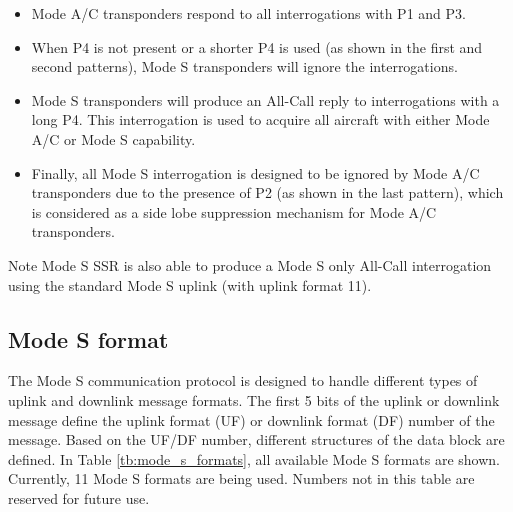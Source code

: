 \begin{itemize}
  \item Mode A/C transponders respond to all interrogations with P1 and P3.
  \item When P4 is not present or a shorter P4 is used (as shown in the first and second patterns), Mode S transponders will ignore the interrogations.
  \item Mode S transponders will produce an All-Call reply to interrogations with a long P4. This interrogation is used to acquire all aircraft with either Mode A/C or Mode S capability.
  \item Finally, all Mode S interrogation is designed to be ignored by Mode A/C transponders due to the presence of P2 (as shown in the last pattern), which is considered as a side lobe suppression mechanism for Mode A/C transponders.
\end{itemize}


\begin{notebox}{Note}
  Mode S SSR is also able to produce a Mode S only All-Call interrogation using the standard Mode S uplink (with uplink format 11).
\end{notebox}


\subsection{Mode S format}

The Mode S communication protocol is designed to handle different types of uplink and downlink message formats. The first 5 bits of the uplink or downlink message define the uplink format (UF) or downlink format (DF) number of the message. Based on the UF/DF number, different structures of the data block are defined. In Table \ref{tb:mode_s_formats}, all available Mode S formats are shown. Currently, 11 Mode S formats are being used. Numbers not in this table are reserved for future use.

